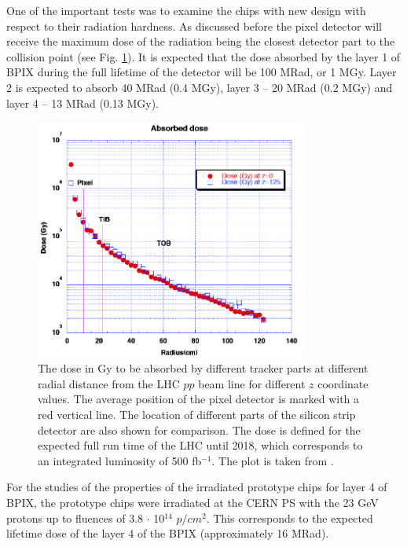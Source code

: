 One of the important tests was to examine the chips with new design with respect to their radiation hardness. As discussed before the
pixel detector will receive the maximum dose of the radiation being the closest detector part to the collision point (see Fig. \ref{fig:irrad_dose}).
It is expected that the dose absorbed by the layer 1 of BPIX during the full lifetime of the detector will be 100 MRad, or 1 MGy. Layer 2 is 
expected to absorb 40 MRad (0.4 MGy), layer 3 -- 20 MRad (0.2 MGy) and layer 4 -- 13 MRad (0.13 MGy).

\begin{figure}[t]
 \centering
 \includegraphics[width=0.8\textwidth]{021_pixel_upgrade/plots/irradiation_dose.png}
 \caption{The dose in Gy to be absorbed by different tracker parts at different radial distance from the LHC $pp$ beam line for different
 $z$ coordinate values. The average position of the pixel detector is marked with a red vertical line. The location of different parts of the 
 silicon strip detector are also shown for comparison. The dose is defined for the expected full run time of the LHC until 2018, which 
 corresponds to an integrated luminosity of 500 fb$^{-1}$. The plot is taken from \cite{CMS:2012sda}.}
 \label{fig:irrad_dose}
\end{figure}

For the studies of the properties of the irradiated prototype chips for layer 4 of BPIX, the prototype
chips were irradiated at the CERN PS \cite{CERNTB} with the 23 GeV protons up to fluences of 3.8 $\cdot$ 10$^{14}$ $p/cm^{2}$. This corresponds to 
the expected lifetime dose of the layer 4 of the BPIX (approximately 16 MRad). 

